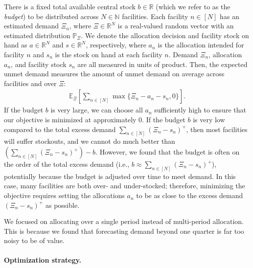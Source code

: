 \documentclass[12pt]{article}
\begin{document}
There is a fixed total available central stock $b\in\mathbb{R}$ (which we refer to as the \emph{budget}) to be distributed across $N\in\mathbb{N}$ facilities. Each facility $n\in[N]$ has an estimated demand $\Xi_n$, where $\Xi\in\mathbb{R}^N$ is a real-valued random vector with an estimated distribution $\mathbb{P}_{\Xi}$. We denote the allocation decision and facility stock on hand as $a\in\mathbb{R}^N$ and $s\in\mathbb{R}^N$, respectively, where $a_n$ is the allocation intended for facility $n$ and $s_n$ is the stock on hand at each facility $n$. Demand $\Xi_n$, allocation $a_n$, and facility stock $s_n$ are all measured in units of product. Then, the expected unmet demand measures the amount of unmet demand on average across facilities and over $\Xi$:
\begin{align}
\label{eq:obj}
\mathbb{E}_{\Xi}\left[\sum_{n\in[N]}\max\{\Xi_n-a_n-s_n,0\}\right].
\end{align}
If the budget $b$ is very large, we can choose all $a_n$ sufficiently high to ensure that our objective is minimized at approximately $0$. If the budget $b$ is very low compared to the total excess demand $\sum_{n\in [N]} (\Xi_n - s_n)^+$, then most facilities will suffer stockouts, and we cannot do much better than
$(\sum_{n\in [N]} (\Xi_n - s_n)^+) - b.$ However, we found that the budget is often on the order of the total excess demand (i.e., $b \approx \sum_{n\in [N]} (\Xi_n - s_n)^+$), potentially because the budget is adjusted over time to meet demand. In this case, many facilities are both over- and under-stocked; therefore, minimizing the objective requires setting the allocations $a_n$ to be as close to the excess demand $(\Xi_n - s_n)^+$ as possible.

We focused on allocating over a single period instead of multi-period allocation. This is because we found that forecasting demand beyond one quarter is far too noisy to be of value.

\paragraph{Optimization strategy.}
\label{sup:optimization}
\end{document}
